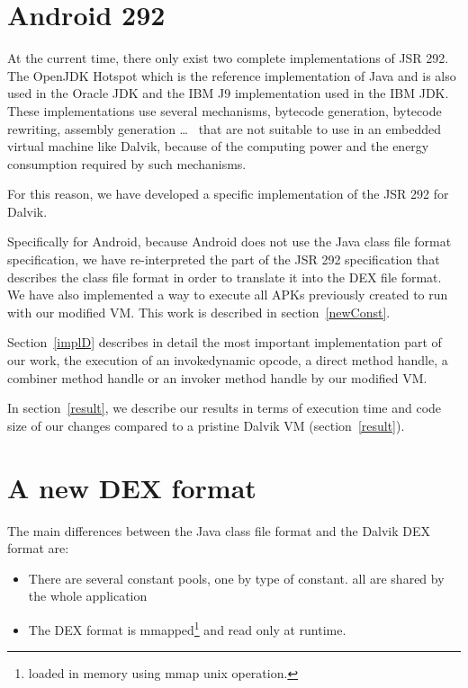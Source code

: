 \documentclass{sig-alternate}
\def \DALVIK{Dalvik\xspace}
\def \Jsr{JSR\xspace}
\def \JSR{\Jsr 292\xspace}
\def \ANDROID{Android\xspace}
\begin{document}
\section{\ANDROID 292}
  At the current time, there only exist two complete implementations of \JSR.
  The OpenJDK Hotspot which is the reference implementation of Java and is also used in the Oracle JDK
  and the IBM J9 implementation used in the IBM JDK.
  These implementations use several mechanisms, bytecode generation, bytecode rewriting, assembly generation
  \dots~\cite{jvmsummit-heidinga-mhimpl-2010}\cite{jvmsummit-heidinga-mhimpl-2011}\cite{jvmsummit-rose-mhimpl-2011}
  that are not suitable to use in an embedded virtual machine like \DALVIK,
  because of the computing power and the energy consumption required by such mechanisms.

  For this reason, we have developed a specific implementation of the \JSR for \DALVIK.

  Specifically for \ANDROID, because \ANDROID does not use the Java class file format specification,
  we have re-interpreted the part of the \JSR specification that describes the class file format
  in order to translate it into the DEX file format.
  We have also implemented a way to execute all APKs previously created to run with our modified VM.
  This work is described in section~\ref{newConst}.
  
  Section~\ref{implD} describes in detail the most important implementation part of our work,
  the execution of an invokedynamic opcode, a direct method handle, a combiner method handle or
  an invoker method handle by our modified VM.
  
  In section~\ref{result}, we describe our results in terms of execution time and code size of our changes
  compared to a pristine Dalvik VM (section~\ref{result}).\\

\section{A new DEX format}
\label{newDEX}

  The main differences between the Java class file format and the Dalvik DEX format are:
  \begin{itemize}
   \item There are several constant pools, one by type of constant.
         all are shared by the whole application
   \item The DEX format is mmapped\footnote{loaded in memory using mmap unix operation.}
    and read only at runtime.
  \end{itemize}
  
\end{document}
